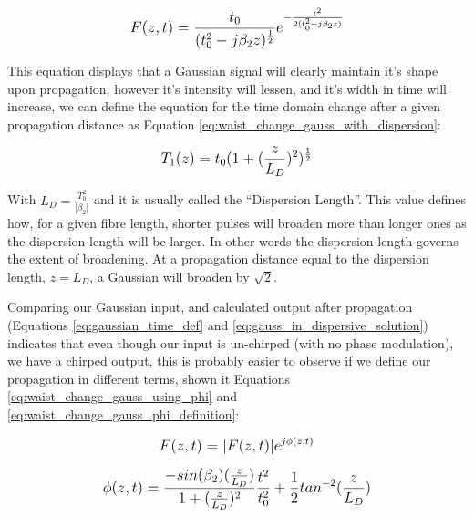 \documentclass[colorlinks,11pt,a4paper,normalphoto,withhyper,ragged2e]{altareport}
\begin{document}
	\begin{equation} \label{eq:gauss_in_dispersive_solution}
		\mathlarger{F(z, t) = \frac{t_0}{(t_0^2 - j \beta_2 z)^{\frac{1}{2}}} e^{- \frac{t^2}{2(t_0^2 - j \beta_2 z)}} }
	\end{equation}
	
	\vspace{5mm}
	
	This equation displays that a Gaussian signal will clearly maintain it's shape upon propagation, however it's intensity will lessen, and it's width in time will increase, we can define the equation for the time domain change after a given propagation distance as Equation \ref{eq:waist_change_gauss_with_dispersion}:
	
		\begin{equation} \label{eq:waist_change_gauss_with_dispersion}
			\mathlarger{T_1(z) = t_0(1 + (\frac{z}{L_D})^2)^{\frac{1}{2}} }
		\end{equation}
		
	With $L_D = \frac{T_0^2}{|\beta_2|}$ and it is usually called the ``Dispersion Length''. This value defines how, for a given fibre length, shorter pulses will broaden more than longer ones as the dispersion length will be larger. In other words the dispersion length governs the extent of broadening. At a propagation distance equal to the dispersion length, $z = L_D$, a Gaussian will broaden by $\sqrt{2}$. \linebreak
		
	Comparing our Gaussian input, and calculated output after propagation (Equations \ref{eq:gaussian_time_def} and \ref{eq:gauss_in_dispersive_solution}) indicates that even though our input is un-chirped (with no phase modulation), we have a chirped output, this is probably easier to observe if we define our propagation in different terms, shown it Equations \ref{eq:waist_change_gauss_using_phi} and \ref{eq:waist_change_gauss_phi_definition}:
		
		\begin{equation} \label{eq:waist_change_gauss_using_phi}
			\mathlarger{ F(z, t) = |F(z, t)| e^{j \phi(z,t)} }
		\end{equation}
			
		\vspace{5mm}
			
		\begin{equation} \label{eq:waist_change_gauss_phi_definition}
			\mathlarger{ \phi(z,t)  = \frac{-sin(\beta_2)(\frac{z}{L_D})}{1 + (\frac{z}{L_D})^2} \frac{t^2}{t_0^2} + \frac{1}{2} tan^{-2}(\frac{z}{L_D}) }
		\end{equation}
			
\end{document}
